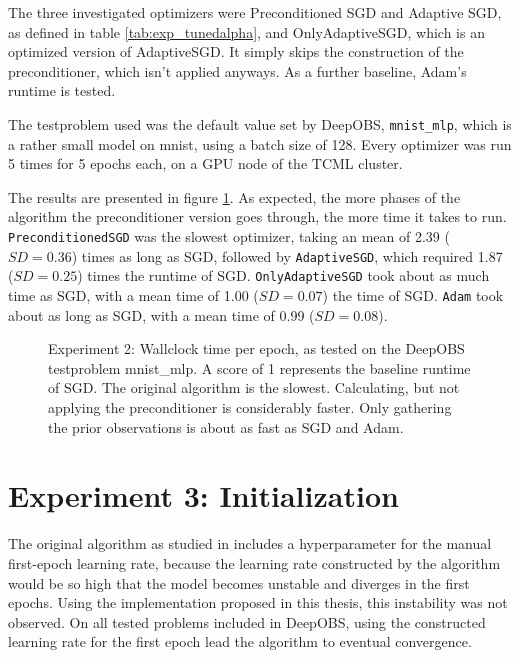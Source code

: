 \documentclass[twoside,12pt,a4paper]{report}
\begin{document}
The three investigated optimizers were Preconditioned SGD and Adaptive SGD, as defined in table \ref{tab:exp_tunedalpha}, and OnlyAdaptiveSGD, which is an optimized version of AdaptiveSGD. It simply skips the construction of the preconditioner, which isn't applied anyways.
As a further baseline, Adam's runtime is tested.

The testproblem used was the default value set by DeepOBS, \verb|mnist_mlp|, which is a rather small model on mnist, using a batch size of 128. Every optimizer was run 5 times for 5 epochs each, on a GPU node of the TCML cluster.

The results are presented in figure \ref{fig:exp_perf_prec}. As expected, the more phases of the algorithm the preconditioner version goes through, the more time it takes to run.
\verb|PreconditionedSGD| was the slowest optimizer, taking an mean of 2.39 ($SD = 0.36$) times as long as SGD, followed by \verb|AdaptiveSGD|, which required 1.87 ($SD = 0.25$) times the runtime of SGD. \verb|OnlyAdaptiveSGD| took about as much time as SGD, with a mean time of 1.00 ($SD = 0.07$) the time of SGD. \verb|Adam| took about as long as SGD, with a mean time of 0.99 ($SD = 0.08$).

\begin{figure}
	\centering \hspace{-1,5cm}
	
	\caption{Experiment 2: Wallclock time per epoch, as tested on the DeepOBS testproblem mnist\_mlp. A score of 1 represents the baseline runtime of SGD. The original algorithm is the slowest. Calculating, but not applying the preconditioner is considerably faster. Only gathering the prior observations is about as fast as SGD and Adam.}
	\label{fig:exp_perf_prec}
	
\end{figure}


\section{Experiment 3: Initialization}
The original algorithm as studied in \cite{roos2019active} includes a hyperparameter for the manual first-epoch learning rate, because the learning rate constructed by the algorithm would be so high that the model becomes unstable and diverges in the first epochs.
Using the implementation proposed in this thesis, this instability was not observed. On all tested problems included in DeepOBS, using the constructed learning rate for the first epoch lead the algorithm to eventual convergence.
\end{document}
